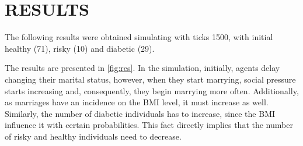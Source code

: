 \section{RESULTS}
    The following results were obtained simulating with ticks 1500, with initial healthy (71), risky (10) and diabetic (29).
    
    The results are presented in \cref{fig:res}. In the simulation, initially, agents delay changing their marital status, however, when they start marrying, social pressure starts increasing and, consequently, they begin marrying more often. Additionally, as marriages have an incidence on the BMI level, it must increase as well. Similarly, the number of diabetic individuals has to increase, since the BMI influence it with certain probabilities. This fact directly implies that the number of risky and healthy individuals need to decrease.
 

